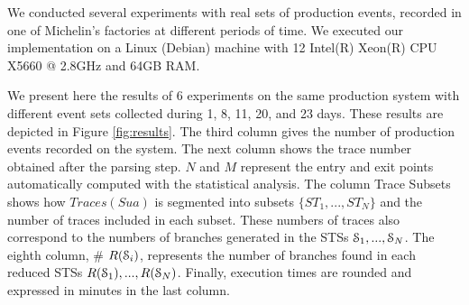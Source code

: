 We conducted several experiments with real sets of production
events, recorded in one of Michelin's factories at different
periods of time. We executed our implementation on a Linux
(Debian) machine with 12 Intel(R) Xeon(R) CPU X5660 @ 2.8GHz and
64GB RAM.

We present here the results of 6 experiments on the same
production system with different event sets collected during 1,
8, 11, 20, and 23 days. These results are depicted in Figure
\ref{fig:results}. The third column gives the number of
production events recorded on the system. The next column shows
the trace number obtained after the parsing step.  $N$ and $M$
represent the entry and exit points automatically computed with
the statistical analysis. The column Trace Subsets shows how
$Traces(Sua)$ is segmented into subsets $\{ST_1,...,ST_N\}$ and
the number of traces included in each subset. These numbers of
traces also correspond to the numbers of branches generated in
the STSs $\EuScript{S}_1,...,\EuScript{S}_N$. The eighth column,
\# $R(\EuScript{S}_i)$, represents the number of branches found
in each reduced STSs $R(\EuScript{S}_1),...,R(\EuScript{S}_N)$.
Finally, execution times are rounded and expressed in minutes in
the last column.

